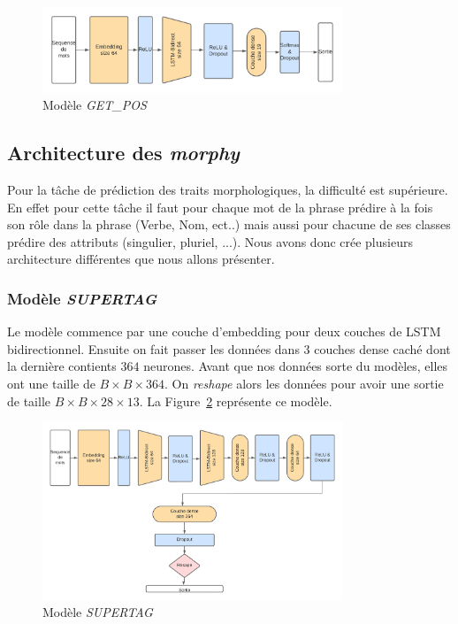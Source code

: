 \documentclass[a4paper]{article}
\begin{document}
\begin{figure}[H]
    \centering
    \includegraphics[width=0.8\textwidth]{get_pos.png}
    \caption{Modèle \textit{GET\_POS}}
    \label{fig: model getpos}
\end{figure} 

\subsection{Architecture des \textit{morphy}}

Pour la tâche de prédiction des traits morphologiques, la difficulté est supérieure. En effet pour cette tâche 
il faut pour chaque mot de la phrase prédire à la fois son rôle dans la phrase (Verbe, Nom, ect..) mais aussi 
pour chacune de ses classes prédire des attributs (singulier, pluriel, ...). Nous avons donc crée plusieurs 
architecture différentes que nous allons présenter.

\subsubsection{Modèle \textit{SUPERTAG}}

Le modèle commence par une couche d'embedding pour deux couches de LSTM bidirectionnel. Ensuite on fait passer les données 
dans 3 couches dense caché dont la dernière contients $364$ neurones. Avant que nos données sorte du modèles, elles ont une
taille de $B \times B \times 364$. On \textit{reshape} alors les données pour avoir une sortie de taille 
$B \times B \times 28 \times 13$. La Figure~\ref{fig: model getmorphy} représente ce modèle.

\begin{figure}[H]
    \centering
    \includegraphics[width=0.8\textwidth]{get_morphy_supertag.png}
    \caption{Modèle \textit{SUPERTAG}}
    \label{fig: model getmorphy}
\end{figure}
\end{document}
